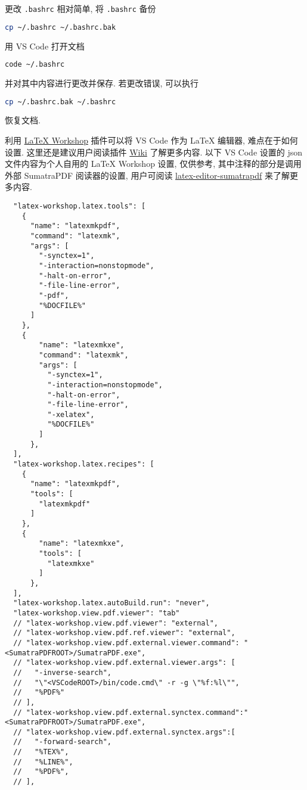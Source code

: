 更改 \texttt{.bashrc} 相对简单,
将 \texttt{.bashrc} 备份
\begin{lstlisting}[language=bash]
  cp ~/.bashrc ~/.bashrc.bak
\end{lstlisting}
用 VS Code 打开文档
\begin{lstlisting}[language=bash]
  code ~/.bashrc
\end{lstlisting}
并对其中内容进行更改并保存.
若更改错误,
可以执行
\begin{lstlisting}[language=bash]
  cp ~/.bashrc.bak ~/.bashrc
\end{lstlisting}
恢复文档.

利用
\href{https://marketplace.visualstudio.com/items?itemName=James-Yu.latex-workshop}{\LaTeX{} Workshop}
插件可以将 VS Code 作为 \LaTeX{} 编辑器,
难点在于如何设置.
这里还是建议用户阅读插件
\href{https://github.com/James-Yu/LaTeX-Workshop/wiki}{Wiki}
了解更多内容.
以下 VS Code 设置的 json 文件内容为个人自用的 \LaTeX{} Workshop 设置,
仅供参考,
其中注释的部分是调用外部 SumatraPDF 阅读器的设置,
用户可阅读
\href{https://github.com/OsbertWang/latex-editor-sumatrapdf}{latex-editor-sumatrapdf}
来了解更多内容.
\begin{lstlisting}
  "latex-workshop.latex.tools": [
    {
      "name": "latexmkpdf",
      "command": "latexmk",
      "args": [
        "-synctex=1",
        "-interaction=nonstopmode",
        "-halt-on-error",
        "-file-line-error",
        "-pdf",
        "%DOCFILE%"
      ]
    },
    {
        "name": "latexmkxe",
        "command": "latexmk",
        "args": [
          "-synctex=1",
          "-interaction=nonstopmode",
          "-halt-on-error",
          "-file-line-error",
          "-xelatex",
          "%DOCFILE%"
        ]
      },
  ],
  "latex-workshop.latex.recipes": [
    {
      "name": "latexmkpdf",
      "tools": [
        "latexmkpdf"
      ]
    },
    {
        "name": "latexmkxe",
        "tools": [
          "latexmkxe"
        ]
      },
  ],
  "latex-workshop.latex.autoBuild.run": "never",
  "latex-workshop.view.pdf.viewer": "tab"
  // "latex-workshop.view.pdf.viewer": "external",
  // "latex-workshop.view.pdf.ref.viewer": "external",
  // "latex-workshop.view.pdf.external.viewer.command": "<SumatraPDFROOT>/SumatraPDF.exe",
  // "latex-workshop.view.pdf.external.viewer.args": [
  //   "-inverse-search",
  //   "\"<VSCodeROOT>/bin/code.cmd\" -r -g \"%f:%l\"",
  //   "%PDF%"
  // ],
  // "latex-workshop.view.pdf.external.synctex.command":"<SumatraPDFROOT>/SumatraPDF.exe",
  // "latex-workshop.view.pdf.external.synctex.args":[
  //   "-forward-search",
  //   "%TEX%",
  //   "%LINE%",
  //   "%PDF%",
  // ],
\end{lstlisting}


